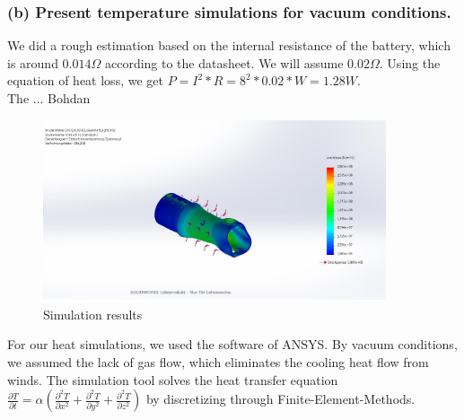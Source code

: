 \subsubsection{(b) Present temperature simulations for vacuum conditions.}
We did a rough estimation based on the internal resistance of the
battery, which is around \(0.014 \Omega \) according to the datasheet. We will assume \(0.02 \Omega\). Using the equation of heat loss, we get \(P = I^2 * R = 8^2 * 0.02 * W = 1.28W\).\\
The ... Bohdan \\
\begin{figure}[H]
    \centering
    \includegraphics[width=0.9\textwidth]{texfiles/elec/eimg/SimulationTemplate}
    \caption{Simulation results}
    \label{img: simresults_battery}
\end{figure}



For our heat simulations, we used the software of ANSYS. By vacuum conditions, we assumed the
lack of gas flow, which eliminates the cooling heat flow from winds. The simulation tool solves
the heat transfer equation \( \frac{\partial T}{\partial t} = \alpha \left( \frac{\partial^2 T}{\partial x^2} + \frac{\partial^2 T}{\partial y^2} + \frac{\partial^2 T}{\partial z^2} \right) \)
by discretizing through Finite-Element-Methods.

